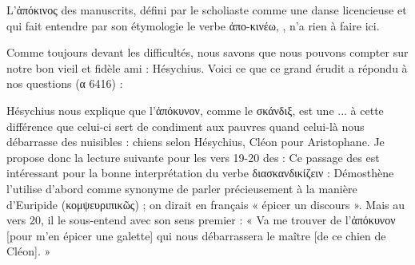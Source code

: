 {L'ἀπόκινος des manuscrits, défini par le scholiaste comme une danse licencieuse et qui fait entendre par son étymologie le verbe ἀπο-κινέω, , n'a rien à faire ici.

Comme toujours devant les difficultés, nous savons que nous pouvons compter sur notre bon vieil et fidèle ami : Hésychius. Voici ce que ce grand érudit a répondu à nos questions (α 6416) :


Hésychius nous explique que l'ἀπόκυνον, comme le σκάνδιξ, est une ... à cette différence que celui-ci sert de condiment aux pauvres quand celui-là nous débarrasse des nuisibles : chiens selon Hésychius, Cléon pour Aristophane. 
Je propose donc la lecture suivante pour les vers 19-20 des  :
Ce passage des  est intéressant pour la bonne interprétation du verbe διασκανδικίζειν : Démosthène l'utilise d'abord comme synonyme de parler précieusement à la manière d'Euripide (κομψευριπικῶς) ; on dirait en français « épicer un discours ».  Mais au vers 20, il le sous-entend avec son sens premier : « Va me trouver de l'ἀπόκυνον [pour m'en épicer une galette] qui nous débarrassera le maître [de ce chien de Cléon]. »

}
